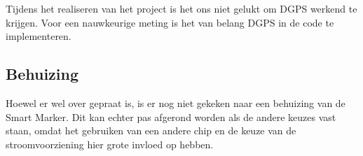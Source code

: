 Tijdens het realiseren van het project is het ons niet gelukt om DGPS werkend te
krijgen. Voor een nauwkeurige meting is het van belang DGPS in de code te
implementeren.

\subsection{Behuizing}
Hoewel er wel over gepraat is, is er nog niet gekeken naar een behuizing van de
Smart Marker. Dit kan echter pas afgerond worden als de andere keuzes vast staan,
omdat het gebruiken van een andere chip en de keuze van de stroomvoorziening hier
grote invloed op hebben.
